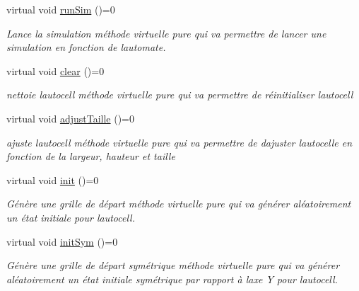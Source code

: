 \begin{DoxyCompactItemize}
virtual void \hyperlink{class_autocell_a83fb2030039bcddc40ee72f44ac38e63}{run\+Sim} ()=0
\begin{DoxyCompactList}\small\item\em Lance la simulation méthode virtuelle pure qui va permettre de lancer une simulation en fonction de l\textquotesingle{}automate. \end{DoxyCompactList}\item 
virtual void \hyperlink{class_autocell_abffbd1e2026f04e489a03cc9bc0c28f4}{clear} ()=0
\begin{DoxyCompactList}\small\item\em nettoie l\textquotesingle{}autocell méthode virtuelle pure qui va permettre de réinitialiser l\textquotesingle{}autocell \end{DoxyCompactList}\item 
virtual void \hyperlink{class_autocell_a060d956fa55ae3871081b3ecb949689f}{adjust\+Taille} ()=0
\begin{DoxyCompactList}\small\item\em ajuste l\textquotesingle{}autocell méthode virtuelle pure qui va permettre de d\textquotesingle{}ajuster l\textquotesingle{}autocelle en fonction de la largeur, hauteur et taille \end{DoxyCompactList}\item 
virtual void \hyperlink{class_autocell_ac505c956de1d90a48e2d3558bdf97253}{init} ()=0
\begin{DoxyCompactList}\small\item\em Génère une grille de départ méthode virtuelle pure qui va générer aléatoirement un état initiale pour l\textquotesingle{}autocell. \end{DoxyCompactList}\item 
virtual void \hyperlink{class_autocell_aa1e1870af0142596a9a81afe7f300a11}{init\+Sym} ()=0
\begin{DoxyCompactList}\small\item\em Génère une grille de départ symétrique méthode virtuelle pure qui va générer aléatoirement un état initiale symétrique par rapport à l\textquotesingle{}axe Y pour l\textquotesingle{}autocell. \end{DoxyCompactList}\end{DoxyCompactItemize}
